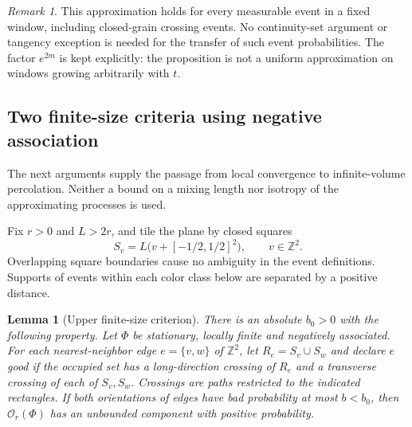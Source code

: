\documentclass[11pt,a4paper]{article}
\newtheorem{lemma}[theorem]{Lemma}
\theoremstyle{definition}
\theoremstyle{remark}
\newtheorem{remark}[theorem]{Remark}
\numberwithin{equation}{section}
\begin{document}
\begin{remark}\label{ell:tv-scope}
This approximation holds for every measurable event in a fixed
window, including closed-grain crossing events.  No continuity-set
argument or tangency exception is needed for the transfer of such
event probabilities.  The factor $e^{2m}$ is kept explicitly:
the proposition is not a uniform approximation on windows growing
arbitrarily with $t$.
\end{remark}

\subsection{Two finite-size criteria using negative association}

The next arguments supply the passage from local convergence to
infinite-volume percolation.  Neither a bound on a mixing length
nor isotropy of the approximating processes is used.

Fix $r>0$ and $L>2r$, and tile the plane by closed squares
\[
 S_v=L\bigl(v+[-1/2,1/2]^2\bigr),\qquad v\in\mathbb Z^2.
\]
Overlapping square boundaries cause no ambiguity in the event
definitions.  Supports of events within each color class below
are separated by a positive distance.

\begin{lemma}[Upper finite-size criterion]\label{ell:upper-criterion}
There is an absolute $b_0>0$ with the following property.
Let $\Phi$ be stationary, locally finite and negatively associated.
For each nearest-neighbor edge $e=\{v,w\}$ of $\mathbb Z^2$,
let $R_e=S_v\cup S_w$ and declare $e$ good if the occupied set
has a long-direction crossing of $R_e$ and a transverse crossing
of each of $S_v,S_w$.  Crossings are paths restricted to the
indicated rectangles.  If both orientations of edges have bad
probability at most $b<b_0$, then
$\mathcal O_r(\Phi)$ has an unbounded component with positive
probability.
\end{lemma}
\end{document}
